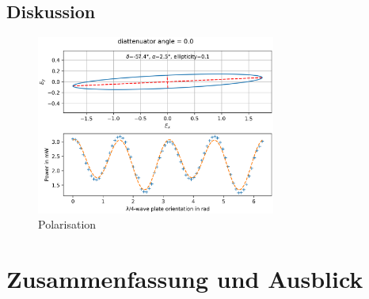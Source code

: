 \documentclass{article}
\begin{document}
	\subsection{Diskussion}
	\begin{figure}[htbp] 
		\centering
		\includegraphics[width=0.7\textwidth]{figures/polarimeter.png}
		\caption{Polarisation}
		\label{fig:polarimeter}
	\end{figure}
\section{Zusammenfassung und Ausblick}
\newpage

	
\end{document}
